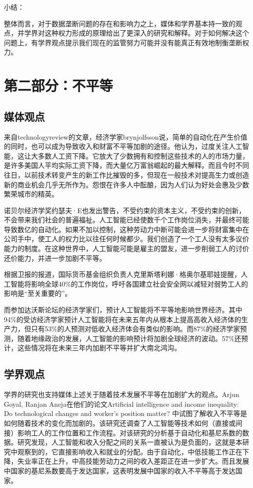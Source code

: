 \documentclass[11pt]{article}
\begin{document}
小结：

整体而言，对于数据垄断问题的存在和影响力之上，媒体和学界基本持一致的观点，并学界对这种权力形成的原理给出了更深入的研究和解释。对于如何解决这个问题上，有学界观点提示我们现在的监管努力可能并没有能真正有效地制衡垄断权力。
\section{第二部分：不平等}

\subsection{媒体观点}

来自technologyreview的文章，经济学家brynjolfsson说，简单的自动化在产生价值的同时，也可以成为导致收入和财富不平等加剧的途径。他认为，过度关注人工智能，这让大多数人工资下降。它放大了少数拥有和控制这些技术的人的市场力量，是许多美国人平均实际工资下降，而大量亿万富翁崛起的最大解释。而且今时不同往日，以前技术转变产生的新工作比摧毁的多，但现在一般技术对提高生力或创造新的商业机会几乎无所作为。怨恨在许多人中酝酿，因为人们认为好处会惠及少数繁荣城市的精英。

诺贝尔经济学奖约瑟夫·E也发出警告，不受约束的资本主义，不受约束的创新，不会带来我们社会的普遍福祉。人工智能已经使数千个工作岗位消失，并最终可能导致数亿的自动化。如果不加以控制，这种劳动力中断可能会进一步将财富集中在公司手中，使工人的权力比以往任何时候都少。我们创造了一个工人没有太多议价能力的制度。在这种世界中，人工智能可能是雇主的盟友，进一步削弱工人的讨价还价能力，并进一步加剧不平等。

根据卫报的报道，国际货币基金组织负责人克里斯塔利娜·格奥尔基耶娃提醒，人工智能将影响全球40\%的工作岗位，呼吁各国建立社会安全网以减轻对弱势工人的影响是“至关重要的”。

而参加达沃斯论坛的经济学家们，预计人工智能将不平等地影响世界经济。其中94\%的受访经济学家预计人工智能将在未来五年内从根本上提高高收入经济体的生产力，但只有53\%的人预测对低收入经济体会有类似的影响。而87\%的经济学家预测，随着地缘政治的发展，人工智能的影响预计将加剧全球经济的波动。57\%还预计，这些情况将在未来三年内加剧不平等并扩大南北鸿沟。

\subsection{学界观点}

学界的研究也支持媒体上述关于随着技术发展不平等在加剧扩大的观点。Arjun Goyal, Ranjan Aneja在他们的论文Artificial intelligence and income inequality: Do technological changes and worker's position matter? 中试图了解收入不平等是如何随着技术的变化而加剧的。该研究还调查了人工智能等技术如何（直接或间接）影响工人的工作位置和工作流程。对该研究的分析基于自动化和基尼系数的数据。研究发现，人工智能和收入分配之间的关系一直被认为是负面的，这就是本研究中观察到的，它直接影响收入和就业的分配。由于自动化，中低技能工作正在下降，失业率正在上升，中高技能劳动力之间的收入差距正在进一步扩大。而且发展中国家的基尼系数要高于发达国家，这表明发展中国家的收入不平等高于发达国家。
\end{document}
